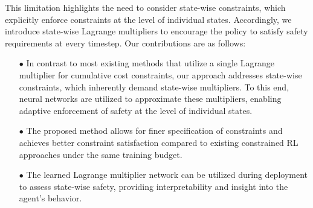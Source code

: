 This limitation highlights the need to consider state-wise constraints, which explicitly enforce constraints at the level of individual states.  %
Accordingly, we introduce state-wise Lagrange multipliers to encourage the policy to satisfy safety requirements at every timestep.
Our contributions are as follows:
\begin{itemize}
    \item[$\bullet$] In contrast to most existing methods that utilize a single Lagrange multiplier for cumulative cost constraints, our approach addresses state-wise constraints, which inherently demand state-wise multipliers.
    To this end, neural networks are utilized to approximate these multipliers, enabling adaptive enforcement of safety at the level of individual states.
    \item[$\bullet$] The proposed method allows for finer specification of constraints and achieves better constraint satisfaction compared to existing constrained RL approaches under the same training budget.
    \item[$\bullet$] The learned Lagrange multiplier network can be utilized during deployment to assess state-wise safety, providing interpretability and insight into the agent’s behavior.
\end{itemize}
